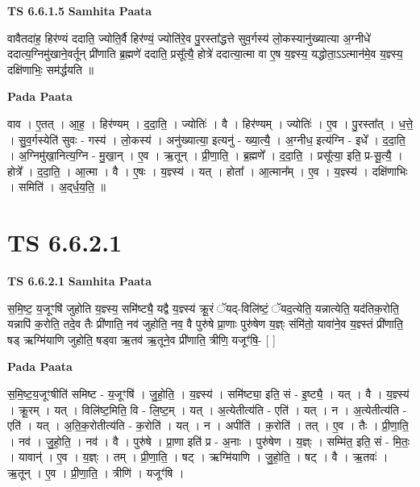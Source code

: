\documentclass[17pt]{extarticle}
\begin{document}
\textbf{TS 6.6.1.5 } \newline
\textbf{Samhita Paata} \newline

वावैतदा॑ह॒ हिर॑ण्यं ददाति॒ ज्योति॒र्वै हिर॑ण्यं॒ ज्योति॑रे॒व पु॒रस्ता᳚द्धत्ते सुव॒र्गस्य॑ लो॒कस्यानु॑ख्यात्या अ॒ग्नीधे॑ ददात्य॒ग्निमु॑खाने॒वर्तून् प्री॑णाति ब्र॒ह्मणे॑ ददाति॒ प्रसू᳚त्यै॒ होत्रे॑ ददात्या॒त्मा वा ए॒ष य॒ज्ञ्स्य॒ यद्धोता॒ऽऽत्मान॑मे॒व य॒ज्ञ्स्य॒ दक्षि॑णाभिः॒ सम॑र्द्धयति ॥ \newline

\textbf{Pada Paata} \newline

वाव । ए॒तत् । आ॒ह॒ । हिर॑ण्यम् । द॒दा॒ति॒ । ज्योतिः॑ । वै । हिर॑ण्यम् । ज्योतिः॑ । ए॒व । पु॒रस्ता᳚त् । ध॒त्ते॒ । सु॒व॒र्गस्येति॑ सुवः - गस्य॑ । लो॒कस्य॑ । अनु॑ख्यात्या॒ इत्यनु॑ - ख्या॒त्यै॒ । अ॒ग्नीध॒ इत्य॑ग्नि - इधे᳚ । द॒दा॒ति॒ । अ॒ग्निमु॑खा॒नित्य॒ग्नि - मु॒खा॒न् । ए॒व । ऋ॒तून् । प्री॒णा॒ति॒ । ब्र॒ह्मणे᳚ । द॒दा॒ति॒ । प्रसू᳚त्या॒ इति॒ प्र-सू॒त्यै॒ । होत्रे᳚ । द॒दा॒ति॒ । आ॒त्मा । वै । ए॒षः । य॒ज्ञ्स्य॑ । यत् । होता᳚ । आ॒त्मान᳚म् । ए॒व । य॒ज्ञ्स्य॑ । दक्षि॑णाभिः । समिति॑ । अ॒द्‌र्ध॒य॒ति॒ ॥  \newline




\section*{ TS 6.6.2.1 }

\textbf{TS 6.6.2.1 } \newline
\textbf{Samhita Paata} \newline

स॒मि॒ष्ट॒ य॒जूꣳषि॑ जुहोति य॒ज्ञ्स्य॒ समि॑ष्ट्यै॒ यद्वै य॒ज्ञ्स्य॑ क्रू॒रं ॅयद्-विलि॑ष्टं॒ ॅयद॒त्येति॒ यन्नात्येति॒ यद॑तिक॒रोति॒ यन्नापि॑ क॒रोति॒ तदे॒व तैः प्री॑णाति॒ नव॑ जुहोति॒ नव॒ वै पुरु॑षे प्रा॒णाः पुरु॑षेण य॒ज्ञ्ः संमि॑तो॒ यावा॑ने॒व य॒ज्ञ्स्तं प्री॑णाति॒ षड् ऋग्मि॑याणि जुहोति॒ षड्वा ऋ॒तव॑ ऋ॒तूने॒व प्री॑णाति॒ त्रीणि॒ यजूꣳ॑षि॒- [  ] \newline

\textbf{Pada Paata} \newline

स॒मि॒ष्ट॒य॒जूꣳषीति॑ समिष्ट - य॒जूꣳषि॑ । जु॒हो॒ति॒ । य॒ज्ञ्स्य॑ । समि॑ष्ट्या॒ इति॒ सं - इ॒ष्ट्यै॒ । यत् । वै । य॒ज्ञ्स्य॑ । क्रू॒रम् । यत् । विलि॑ष्ट॒मिति॒ वि - लि॒ष्ट॒म् । यत् । अ॒त्येतीत्य॑ति - एति॑ । यत् । न । अ॒त्येतीत्य॑ति - एति॑ । यत् । अ॒ति॒क॒रोतीत्य॑ति - क॒रोति॑ । यत् । न । अपीति॑ । क॒रोति॑ । तत् । ए॒व । तैः । प्री॒णा॒ति॒ । नव॑ । जु॒हो॒ति॒ । नव॑ । वै । पुरु॑षे । प्रा॒णा इति॑ प्र - अ॒नाः । पुरु॑षेण । य॒ज्ञ्ः । सम्मि॑त॒ इति॒ सं - मि॒तः॒ । यावान्॑ । ए॒व । य॒ज्ञ्ः । तम् । प्री॒णा॒ति॒ । षट् । ऋग्मि॑याणि । जु॒हो॒ति॒ । षट् । वै । ऋ॒तवः॑ । ऋ॒तून् । ए॒व । प्री॒णा॒ति॒ । त्रीणि॑ । यजूꣳ॑षि ।  \newline
\end{document}
